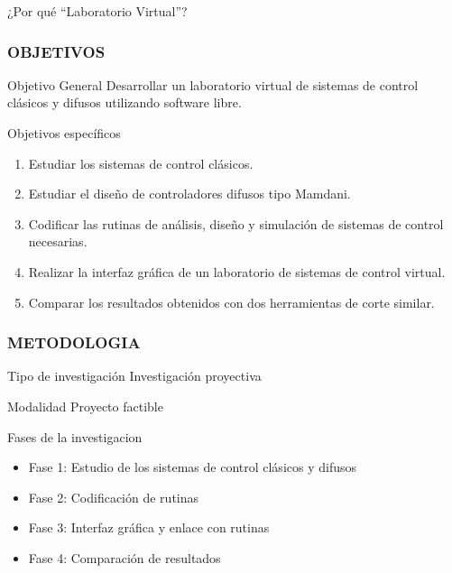 \documentclass[usenames,xcolor={dvipsnames, table}]{beamer}
\begin{document}
\begin{frame}
\begin{block}{¿Por qué ``Laboratorio Virtual''?}
\begin{figure}
			\end{figure}
	\end{block}
\end{frame}

\begin{frame}
	\frametitle{OBJETIVOS}
	\vspace{20pt}
	\begin{block}{Objetivo General}
		Desarrollar un laboratorio virtual de sistemas de control clásicos y difusos utilizando software libre.
	\end{block}
	
	\begin{block}{Objetivos específicos}
		\begin{enumerate} 
			\item Estudiar los sistemas de control clásicos.
			\item Estudiar el diseño de controladores difusos tipo Mamdani.
			\item Codificar las rutinas de análisis, diseño y simulación de sistemas de control necesarias.
			\item Realizar la interfaz gráfica de un laboratorio de sistemas de control virtual.
			\item Comparar los resultados obtenidos con dos herramientas de corte similar.
		\end{enumerate}
	\end{block}
	
\end{frame}

\begin{frame}
	\frametitle{METODOLOGIA}

	\vspace{20pt}
	
	\begin{block}{Tipo de investigación}
		Investigación proyectiva
	\end{block}

	\begin{block}{Modalidad}
		Proyecto factible
	\end{block}

	\begin{block}{Fases de la investigacion}
		\begin{itemize}
			\item Fase 1: Estudio de los sistemas de control clásicos y difusos
			\item Fase 2: Codificación de rutinas
			\item Fase 3: Interfaz gráfica y enlace con rutinas
			\item Fase 4: Comparación de resultados
		\end{itemize}
	\end{block}	
\end{frame}
\end{document}
